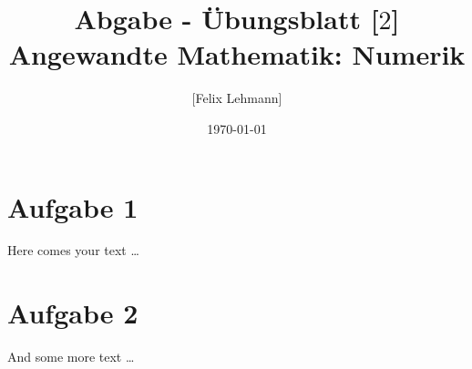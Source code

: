 \documentclass[10pt,a4paper]{article}
\begin{document}
\title{Abgabe - Übungsblatt [$2$]\\
\small{Angewandte Mathematik: Numerik}}
\author{ [Felix Lehmann] }
\date{\today}
\maketitle

\section*{Aufgabe 1}
Here comes your text \ldots

\section*{Aufgabe 2}
And some more text \ldots
\end{document}
